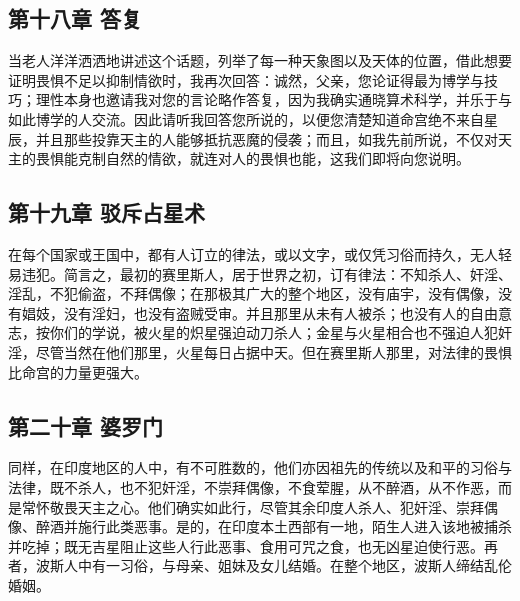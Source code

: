 
\subsection{第十八章 答复}

当老人洋洋洒洒地讲述这个话题，列举了每一种天象图以及天体的位置，借此想要证明畏惧不足以抑制情欲时，我再次回答：诚然，父亲，您论证得最为博学与技巧；理性本身也邀请我对您的言论略作答复，因为我确实通晓算术科学，并乐于与如此博学的人交流。因此请听我回答您所说的，以便您清楚知道命宫绝不来自星辰，并且那些投靠天主的人能够抵抗恶魔的侵袭；而且，如我先前所说，不仅对天主的畏惧能克制自然的情欲，就连对人的畏惧也能，这我们即将向您说明。\par


\subsection{第十九章 驳斥占星术}

在每个国家或王国中，都有人订立的律法，或以文字，或仅凭习俗而持久，无人轻易违犯。简言之，最初的赛里斯人，居于世界之初，订有律法：不知杀人、奸淫、淫乱，不犯偷盗，不拜偶像；在那极其广大的整个地区，没有庙宇，没有偶像，没有娼妓，没有淫妇，也没有盗贼受审。并且那里从未有人被杀；也没有人的自由意志，按你们的学说，被火星的炽星强迫动刀杀人；金星与火星相合也不强迫人犯奸淫，尽管当然在他们那里，火星每日占据中天。但在赛里斯人那里，对法律的畏惧比命宫的力量更强大。\par


\subsection{第二十章 婆罗门}

同样，在印度地区的人中，有不可胜数的，他们亦因祖先的传统以及和平的习俗与法律，既不杀人，也不犯奸淫，不崇拜偶像，不食荤腥，从不醉酒，从不作恶，而是常怀敬畏天主之心。他们确实如此行，尽管其余印度人杀人、犯奸淫、崇拜偶像、醉酒并施行此类恶事。是的，在印度本土西部有一地，陌生人进入该地被捕杀并吃掉；既无吉星阻止这些人行此恶事、食用可咒之食，也无凶星迫使行恶。再者，波斯人中有一习俗，与母亲、姐妹及女儿结婚。在整个地区，波斯人缔结乱伦婚姻。\par

